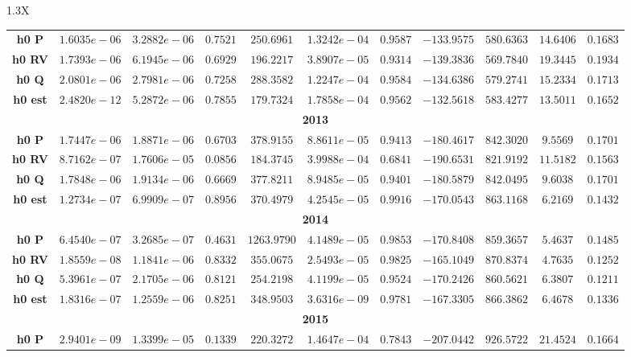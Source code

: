 \documentclass[10pt]{article}
\begin{document}
{\begin{tabularx}{1.3\textwidth}{X}
{\begin{tabular}{ccccccccccc}
\cmidrule(r){1-11} 
 { {\bf h0 P}}& $1.6035e-06$ & $3.2882e-06$ & $0.7521$ & $250.6961$ & $1.3242e-04$ & $0.9587$ & $-133.9575$& $580.6363$& $14.6406$ &$0.1683$\\
 { {\bf h0 RV}}& $1.7393e-06$ & $6.1945e-06$ & $0.6929$ & $196.2217$ & $3.8907e-05$ & $0.9314$ & $-139.3836$& $569.7840$& $19.3445$ &$0.1934$\\
 { {\bf h0 Q}}& $2.0801e-06$ & $2.7981e-06$ & $0.7258$ & $288.3582$ & $1.2247e-04$ & $0.9584$ & $-134.6386$& $579.2741$& $15.2334$ &$0.1713$\\
 { {\bf h0 est}}& $2.4820e-12$ & $5.2872e-06$ & $0.7855$ & $179.7324$ & $1.7858e-04$ & $0.9562$ & $-132.5618$& $583.4277$& $13.5011$ &$0.1652$\\
\bottomrule
\multicolumn{11}{c}{{\bf2013}} \\
\cmidrule(r){1-11} 
 { {\bf h0 P}}& $1.7447e-06$ & $1.8871e-06$ & $0.6703$ & $378.9155$ & $8.8611e-05$ & $0.9413$ & $-180.4617$& $842.3020$& $9.5569$ &$0.1701$\\
 { {\bf h0 RV}}& $8.7162e-07$ & $1.7606e-05$ & $0.0856$ & $184.3745$ & $3.9988e-04$ & $0.6841$ & $-190.6531$& $821.9192$& $11.5182$ &$0.1563$\\
 { {\bf h0 Q}}& $1.7848e-06$ & $1.9134e-06$ & $0.6669$ & $377.8211$ & $8.9485e-05$ & $0.9401$ & $-180.5879$& $842.0495$& $9.6038$ &$0.1701$\\
 { {\bf h0 est}}& $1.2734e-07$ & $6.9909e-07$ & $0.8956$ & $370.4979$ & $4.2545e-05$ & $0.9916$ & $-170.0543$& $863.1168$& $6.2169$ &$0.1432$\\
\bottomrule
\multicolumn{11}{c}{{\bf2014}} \\
\cmidrule(r){1-11} 
 { {\bf h0 P}}& $6.4540e-07$ & $3.2685e-07$ & $0.4631$ & $1263.9790$ & $4.1489e-05$ & $0.9853$ & $-170.8408$& $859.3657$& $5.4637$ &$0.1485$\\
 { {\bf h0 RV}}& $1.8559e-08$ & $1.1841e-06$ & $0.8332$ & $355.0675$ & $2.5493e-05$ & $0.9825$ & $-165.1049$& $870.8374$& $4.7635$ &$0.1252$\\
 { {\bf h0 Q}}& $5.3961e-07$ & $2.1705e-06$ & $0.8121$ & $254.2198$ & $4.1199e-05$ & $0.9524$ & $-170.2426$& $860.5621$& $6.3807$ &$0.1211$\\
 { {\bf h0 est}}& $1.8316e-07$ & $1.2559e-06$ & $0.8251$ & $348.9503$ & $3.6316e-09$ & $0.9781$ & $-167.3305$& $866.3862$& $6.4678$ &$0.1336$\\
\bottomrule
\multicolumn{11}{c}{{\bf2015}} \\
\cmidrule(r){1-11} 
 { {\bf h0 P}}& $2.9401e-09$ & $1.3399e-05$ & $0.1339$ & $220.3272$ & $1.4647e-04$ & $0.7843$ & $-207.0442$& $926.5722$& $21.4524$ &$0.1664$\\

\end{tabular}}
\end{tabularx}}
\end{document}
